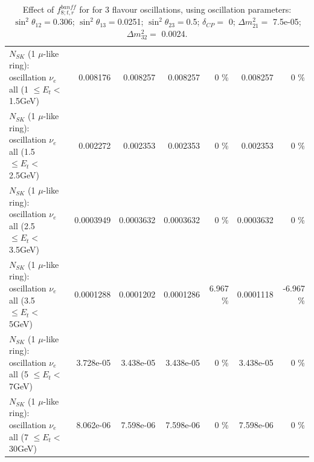 \begin{table}
\begin{tabular}{| l | r | r | r  r | r  r |}
$N_{SK}$ (1 $\mu$-like ring): oscillation $\nu_{e}$ all (1 $\leq E_{t} <$ 1.5GeV) &        0.008176 &        0.008257 &        0.008257 &        0 \%  &        0.008257 &        0 \%  \\ 
$N_{SK}$ (1 $\mu$-like ring): oscillation $\nu_{e}$ all (1.5 $\leq E_{t} <$ 2.5GeV) &        0.002272 &        0.002353 &        0.002353 &        0 \%  &        0.002353 &        0 \%  \\ 
$N_{SK}$ (1 $\mu$-like ring): oscillation $\nu_{e}$ all (2.5 $\leq E_{t} <$ 3.5GeV) &       0.0003949 &       0.0003632 &       0.0003632 &        0 \%  &       0.0003632 &        0 \%  \\ 
$N_{SK}$ (1 $\mu$-like ring): oscillation $\nu_{e}$ all (3.5 $\leq E_{t} <$ 5GeV) &       0.0001288 &       0.0001202 &       0.0001286 &    6.967 \%  &       0.0001118 &   -6.967 \%  \\ 
 $N_{SK}$ (1 $\mu$-like ring): oscillation $\nu_{e}$ all (5 $\leq E_{t} <$ 7GeV) &       3.728e-05 &       3.438e-05 &       3.438e-05 &        0 \%  &       3.438e-05 &        0 \%  \\ 
$N_{SK}$ (1 $\mu$-like ring): oscillation $\nu_{e}$ all (7 $\leq E_{t} <$ 30GeV) &       8.062e-06 &       7.598e-06 &       7.598e-06 &        0 \%  &       7.598e-06 &        0 \%  \\ 
\hline
\hline
\end{tabular}
\caption{ Effect of $f_{8; t, r}^{banff}$ for for 3 flavour oscillations, using oscillation parameters:  $\sin^2\theta_{12} = $0.306; $\sin^2\theta_{13} = $0.0251; $\sin^2\theta_{23} = $0.5; $\delta_{CP} = $        0; $\Delta m^2_{21} = $    7.5e-05; $\Delta m^2_{32} = $    0.0024. }
\label{tab:num_banff_08_1RmuT_3f_osc_t13:0.0251}
\end{table}
\clearpage
